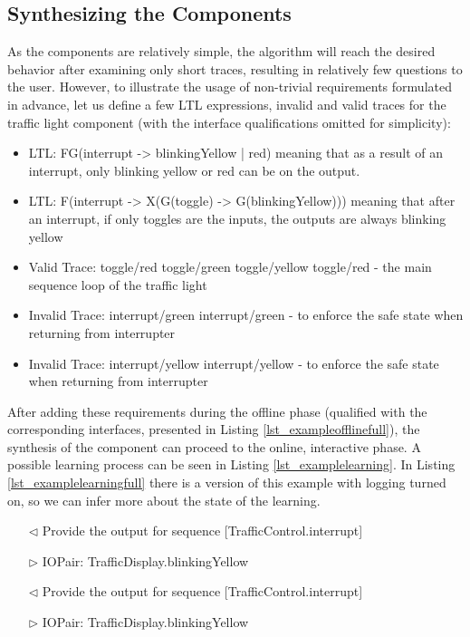 \subsection{Synthesizing the Components} \label{subs_casestudysynth}

As the components are relatively simple, the algorithm will reach the desired behavior after examining only short traces, resulting in relatively few questions to the user. However, to illustrate the usage of non-trivial requirements formulated in advance, let us define a few LTL expressions, invalid and valid traces for the traffic light component (with the interface qualifications omitted for simplicity):

\begin{itemize}
	\item LTL: FG(interrupt -> blinkingYellow | red) meaning that as a result of an interrupt, only blinking yellow or red can be on the output. 
	\item LTL: F(interrupt -> X(G(toggle) -> G(blinkingYellow))) meaning that after an interrupt, if only toggles are the inputs, the outputs are always blinking yellow
	\item Valid Trace: toggle/red toggle/green toggle/yellow toggle/red - the main sequence loop of the traffic light
	\item Invalid Trace: interrupt/green interrupt/green - to enforce the safe state when returning from interrupter
	\item Invalid Trace: interrupt/yellow interrupt/yellow - to enforce the safe state when returning from interrupter 
\end{itemize}

After adding these requirements during the offline phase (qualified with the corresponding interfaces, presented in Listing \ref{lst_exampleofflinefull}), the synthesis of the component can proceed to the online, interactive phase. A possible learning process can be seen in Listing \ref{lst_examplelearning}. In Listing \ref{lst_examplelearningfull} there is a version of this example with logging turned on, so we can infer more about the state of the learning.

\begin{itemize}
	\item[$\triangleleft$] Provide the output for sequence [TrafficControl.interrupt]
	\item[$\triangleright$] IOPair: TrafficDisplay.blinkingYellow
	\item[$\triangleleft$] Provide the output for sequence [TrafficControl.interrupt]
	\item[$\triangleright$] IOPair: TrafficDisplay.blinkingYellow
\end{itemize}

